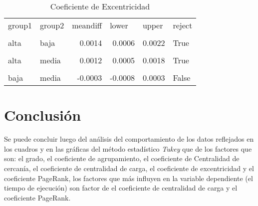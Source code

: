 \documentclass{article}
\begin{document}
\begin{table}[htbp]
  \centering
  \caption{Coeficiente de Excentricidad}
    \begin{tabular}{llrrrl}
    group1 & group2 & \multicolumn{1}{l}{meandiff} & \multicolumn{1}{l}{lower} & \multicolumn{1}{l}{upper} & reject \\
          &       &       &       &       &  \\
    alta  & baja  & 0.0014 & 0.0006 & 0.0022 & True \\
          &       &       &       &       &  \\
    alta  & media & 0.0012 & 0.0005 & 0.0018 & True \\
          &       &       &       &       &  \\
    baja  & media & -0.0003 & -0.0008 & 0.0003 & False \\
    \end{tabular}%
  \label{tab:addlabel}%
\end{table}%


\section{Conclusión}

Se puede concluir luego del análisis del comportamiento de los datos reflejados en los cuadros y en las gráficas del método estadístico \textit{Tukey} que de los factores que son: el grado, el coeficiente de agrupamiento, el coeficiente de Centralidad de cercanía, el coeficiente de centralidad de carga, el coeficiente de excentricidad  y el coeficiente PageRank, los factores que más influyen en la variable dependiente (el tiempo de ejecución) son factor de el coeficiente de centralidad de carga y el coeficiente PageRank.



\end{document}
